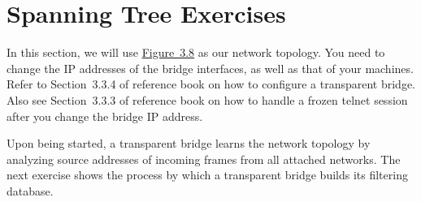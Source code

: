 \documentclass{UTNetLab}
\begin{document}
\part{Spanning Tree Exercises}
\label{sec:spanning-tree}
    In this section, we will use \hyperref[fig:3.8]{Figure~3.8} as our network topology.
    You need to change the IP addresses of the bridge interfaces, as well as that of your machines. Refer to Section~3.3.4 of reference book on how to configure a transparent bridge.
    Also see Section~3.3.3 of reference book on how to handle a frozen telnet session after you change the bridge IP address.

    Upon being started, a transparent bridge learns the network topology by analyzing source addresses of incoming frames from all attached networks.
    The next exercise shows the process by which a transparent bridge builds its filtering database.
\end{document}

